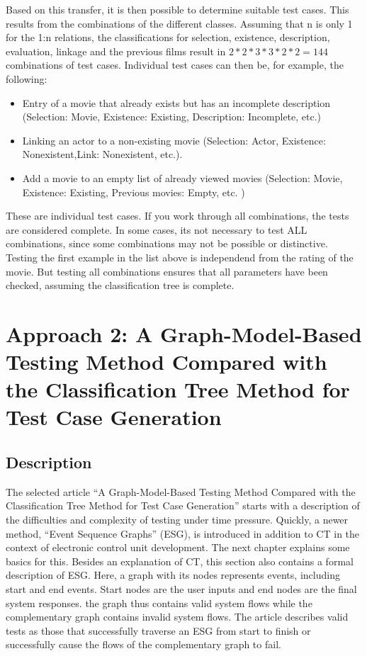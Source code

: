 Based on this transfer, it is then possible to determine suitable test cases. This results from the combinations of the different classes. Assuming that n is only 1 for the 1:n relations, the classifications for selection, existence, description, evaluation, linkage and the previous films result in $2*2*3*3*2*2 = 144$ combinations of test cases. Individual test cases can then be, for example, the following:

\begin{itemize}
\item Entry of a movie that already exists but has an incomplete description (Selection: Movie, Existence: Existing, Description: Incomplete, etc.)
\item Linking an actor to a non-existing movie (Selection: Actor, Existence: Nonexistent,Link: Nonexistent, etc.).
\item Add a movie to an empty list of already viewed movies (Selection: Movie, Existence: Existing, Previous movies: Empty, etc. )
\end{itemize}

These are individual test cases. If you work through all combinations, the tests are considered complete. In some cases, its not necessary to test ALL combinations, since some combinations may not be possible or distinctive. Testing the first example in the list above is independend from the rating of the movie. But testing all combinations ensures that all parameters have been checked, assuming the classification tree is complete.

\section{Approach 2: A Graph-Model-Based Testing Method Compared with the Classification Tree Method for Test Case Generation}
\label{Kap:Approach2}

\subsection{Description}

The selected article \enquote{A Graph-Model-Based Testing Method Compared with the Classification Tree Method for Test Case Generation} starts with a description of the difficulties and complexity of testing under time pressure. Quickly, a newer method, \enquote{Event Sequence Graphs} (ESG), is introduced in addition to CT in the context of electronic control unit development. The next chapter explains some basics for this. Besides an explanation of CT, this section also contains a formal description of ESG. Here, a graph with its nodes represents events, including start and end events. Start nodes are the user inputs and end nodes are the final system responses. the graph thus contains valid system flows while the complementary graph contains invalid system flows. The article describes valid tests as those that successfully traverse an ESG from start to finish or successfully cause the flows of the complementary graph to fail.

